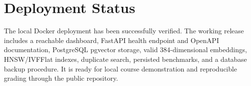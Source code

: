 \documentclass[conference]{IEEEtran}
\begin{document}
\section{Deployment Status}
The local Docker deployment has been successfully verified. The working release includes a reachable dashboard, FastAPI health endpoint and OpenAPI documentation, PostgreSQL pgvector storage, valid 384-dimensional embeddings, HNSW/IVFFlat indexes, duplicate search, persisted benchmarks, and a database backup procedure. It is ready for local course demonstration and reproducible grading through the public repository.
\end{document}
